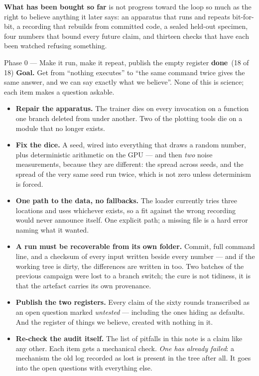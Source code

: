 \documentclass[11pt,a4paper]{article}
\newcommand{\dn}{\textcolor{good}{\textbf{done}}}
\begin{document}
\textbf{What has been bought so far} is not progress toward the loop so much as the right to
believe anything it later says: an apparatus that runs and repeats bit-for-bit, a recording that
rebuilds from committed code, a sealed held-out specimen, four numbers that bound every future
claim, and thirteen checks that have each been watched refusing something.

\begin{phasebox}{Phase 0 --- Make it run, make it repeat, publish the empty register \hfill \dn\ (18 of 18)}
\textbf{Goal.} Get from ``nothing executes'' to ``the same command twice gives the same answer, and
we can say exactly what we believe''. None of this is science; each item makes a question askable.

\begin{itemize}
\item \textbf{Repair the apparatus.} The trainer dies on every invocation on a function one branch
deleted from under another. Two of the plotting tools die on a module that no longer exists.
\item \textbf{Fix the dice.} A seed, wired into everything that draws a random number, plus
deterministic arithmetic on the GPU --- and then \emph{two} noise measurements, because they are
different: the spread across seeds, and the spread of the very same seed run twice, which is not
zero unless determinism is forced.
\item \textbf{One path to the data, no fallbacks.} The loader currently tries three locations and
uses whichever exists, so a fit against the wrong recording would never announce itself. One
explicit path; a missing file is a hard error naming what it wanted.
\item \textbf{A run must be recoverable from its own folder.} Commit, full command line, and a
checksum of every input written beside every number --- and if the working tree is dirty, the
differences are written in too. Two batches of the previous campaign were lost to a branch switch;
the cure is not tidiness, it is that the artefact carries its own provenance.
\item \textbf{Publish the two registers.} Every claim of the sixty rounds transcribed as an open
question marked \emph{untested} --- including the ones hiding as defaults. And the register of
things we believe, created with nothing in it.
\item \textbf{Re-check the audit itself.} The list of pitfalls in this note is a claim like any
other. Each item gets a mechanical check. \emph{One has already failed}: a mechanism the old log
recorded as lost is present in the tree after all. It goes into the open questions with everything
else.
\end{itemize}


\end{phasebox}
\end{document}
